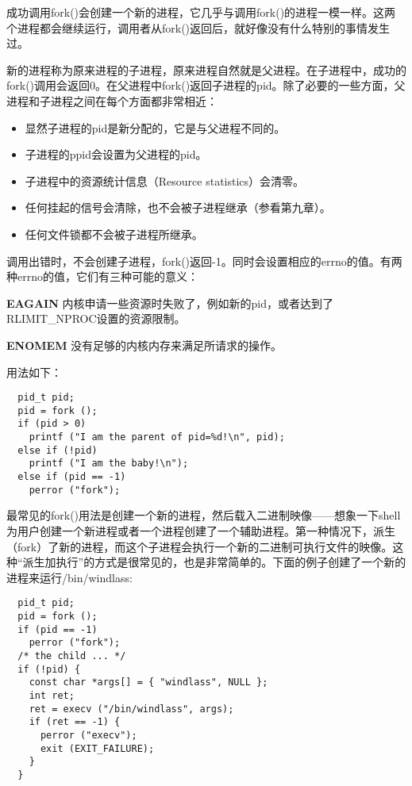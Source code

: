 成功调用fork()会创建一个新的进程，它几乎与调用fork()的进程一模一样。这两个进程都会继续运行，调用者从fork()返回后，就好像没有什么特别的事情发生过。

新的进程称为原来进程的子进程，原来进程自然就是父进程。在子进程中，成功的fork()调用会返回0。在父进程中fork()返回子进程的pid。除了必要的一些方面，父进程和子进程之间在每个方面都非常相近：

\begin{itemize}
\item 显然子进程的pid是新分配的，它是与父进程不同的。
\item 子进程的ppid会设置为父进程的pid。
\item 子进程中的资源统计信息（Resource statistics）会清零。
\item 任何挂起的信号会清除，也不会被子进程继承（参看第九章）。
\item 任何文件锁都不会被子进程所继承。
\end{itemize}

调用出错时，不会创建子进程，fork()返回-1。同时会设置相应的errno的值。有两种errno的值，它们有三种可能的意义：

\begin{eqlist*}
\item[\textbf{EAGAIN}] 内核申请一些资源时失败了，例如新的pid，或者达到了RLIMIT\_NPROC设置的资源限制。
\item[\textbf{ENOMEM}] 没有足够的内核内存来满足所请求的操作。
\end{eqlist*}

用法如下：

\begin{lstlisting}
  pid_t pid;
  pid = fork ();
  if (pid > 0)
    printf ("I am the parent of pid=%d!\n", pid);
  else if (!pid)
    printf ("I am the baby!\n");
  else if (pid == -1)
    perror ("fork");
\end{lstlisting}

最常见的fork()用法是创建一个新的进程，然后载入二进制映像——想象一下shell为用户创建一个新进程或者一个进程创建了一个辅助进程。第一种情况下，派生（fork）了新的进程，而这个子进程会执行一个新的二进制可执行文件的映像。这种“派生加执行”的方式是很常见的，也是非常简单的。下面的例子创建了一个新的进程来运行/bin/windlass:

\begin{lstlisting}
  pid_t pid;
  pid = fork ();
  if (pid == -1)
    perror ("fork");
  /* the child ... */
  if (!pid) {
    const char *args[] = { "windlass", NULL };
    int ret;
    ret = execv ("/bin/windlass", args);
    if (ret == -1) {
      perror ("execv");
      exit (EXIT_FAILURE);
    }
  }
\end{lstlisting}

